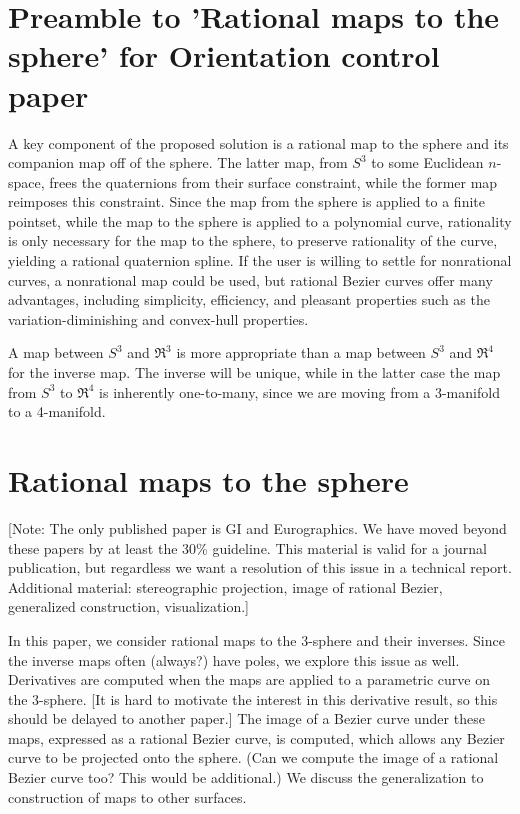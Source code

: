 \documentclass[12pt]{article}
\newif\ifRationalMap
\begin{document}
\clearpage

\ifRationalMap
\section{Preamble to 'Rational maps to the sphere' for Orientation control paper}

A key component of the proposed solution is a rational map to the sphere
and its companion map off of the sphere.
The latter map, from $S^3$ to some Euclidean $n$-space, frees the quaternions from
their surface constraint, while the former map reimposes this constraint.
Since the map from the sphere is applied to a finite pointset, while the map
to the sphere is applied to a polynomial curve, rationality is only necessary for the
map to the sphere, to preserve rationality of the curve, yielding a rational
quaternion spline.
If the user is willing to settle for nonrational curves,
a nonrational map could be used,
but rational Bezier curves offer many advantages, including simplicity,
efficiency, and pleasant properties such as the variation-diminishing and convex-hull
properties.

A map between $S^3$ and $\Re^3$ is more appropriate than a map between $S^3$ and $\Re^4$
for the inverse map.
The inverse will be unique, while in the latter case the map from $S^3$ to $\Re^4$ is
inherently one-to-many, since we are moving from a 3-manifold to a 4-manifold.

\section{Rational maps to the sphere}

[Note: The only published paper is GI and Eurographics.
We have moved beyond these papers by at least the 30\% guideline.
This material is valid for a journal publication, but regardless we want a resolution
of this issue in a technical report.
Additional material: stereographic projection, image of rational Bezier,
generalized construction, visualization.]

In this paper, we consider rational maps to the 3-sphere and their inverses.
Since the inverse maps often (always?) have poles, we explore this issue as well.
Derivatives are computed when the maps are applied to a parametric curve on 
the 3-sphere.
[It is hard to motivate the interest in this derivative result, so this should
be delayed to another paper.]
The image of a Bezier curve under these maps, expressed as a rational Bezier curve,
is computed, which allows any Bezier curve to be projected onto the sphere.
(Can we compute the image of a rational Bezier curve too? This would be additional.)
We discuss the generalization to construction of maps to other surfaces.
\end{document}
